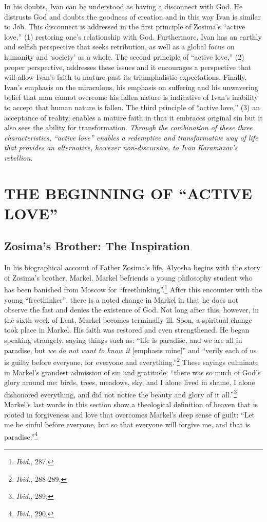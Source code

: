 In his doubts, Ivan can be understood as having a disconnect with God. He distrusts God and doubts the goodness of creation and in this way Ivan is similar to Job. This disconnect is addressed in the first principle of Zosima's ``active love,'' (1) restoring one's relationship with God. Furthermore, Ivan has an earthly and selfish perspective that seeks retribution, as well as a global focus on humanity and `society' as a whole. The second principle of ``active love,'' (2) proper perspective, addresses these issues and it encourages a perspective that will allow Ivan's faith to mature past its triumphalistic expectations. Finally, Ivan's emphasis on the miraculous, his emphasis on suffering and his unwavering belief that man cannot overcome his fallen nature is indicative of Ivan's inability to accept that human nature is fallen. The third principle of ``active love,'' (3) an acceptance of reality, enables a mature faith in that it embraces original sin but it also sees the ability for transformation. \emph{Through the combination of these three characteristics, ``active love'' enables a redemptive and transformative way of life that provides an alternative, however non-discursive,  to Ivan Karamazov's rebellion.}

\chapter{THE BEGINNING OF ``ACTIVE LOVE''}
\section{Zosima's Brother: The Inspiration}
In his biographical account of Father Zosima's life, Alyosha begins with the story of Zosima's brother, Markel. Markel befriends a young philosophy student who has been banished from Moscow for ``freethinking''.\footnote{\emph{Ibid.}, 287.} After this encounter with the young ``freethinker'', there is a noted change in Markel in that he does not observe the fast and denies the existence of God. Not long after this, however, in the sixth week of Lent, Markel becomes terminally ill. Soon, a spiritual change took place in Markel. His faith was restored and even strengthened. He began speaking strangely, saying things such as: ``life is paradise, and we are all in paradise, but \emph{we do not want to know it} [emphasis mine]'' and ``verily each of us is guilty before everyone, for everyone and everything.''\footnote{\emph{Ibid.}, 288-289.} These sayings culminate in Markel's grandest admission of sin and gratitude: ``there was so much of God's glory around me: birds, trees, meadows, sky, and I alone lived in shame, I alone dishonored everything, and did not notice the beauty and glory of it all.''\footnote{\emph{Ibid.}, 289.} Markel's last words in this section show a theological definition of heaven that is rooted in forgiveness and love that overcomes Markel's deep sense of guilt: ``Let me be sinful before everyone, but so that everyone will forgive me, and that is paradise.''\footnote{\emph{Ibid.}, 290.}

